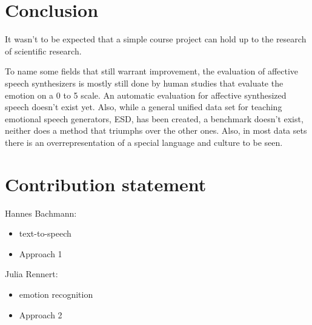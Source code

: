 \documentclass[11pt]{article}
\begin{document}
\section{Conclusion}

It wasn't to be expected that a simple course project can hold up to the research of scientific research.

To name some fields that still warrant improvement, the evaluation of affective speech synthesizers is mostly still done by human studies that evaluate the emotion on a 0 to 5 scale. An automatic evaluation for affective synthesized speech doesn’t exist yet. Also, while a general unified data set for teaching emotional speech generators, ESD, has been created, a benchmark doesn’t exist, neither does a method that triumphs over the other ones. Also, in most data sets there is an overrepresentation of a special language and culture to be seen.

\section{Contribution statement}
Hannes Bachmann:
\begin{itemize}
\item text-to-speech
\item Approach 1
\end{itemize}
Julia Rennert:
\begin{itemize}
\item emotion recognition
\item Approach 2
\end{itemize}
%
% 
\end{document}
